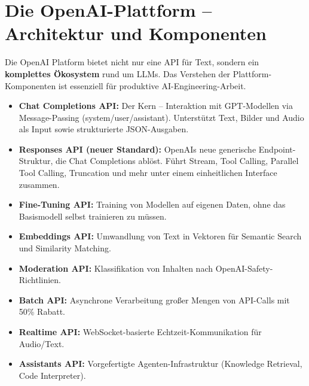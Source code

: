 \section{Die OpenAI-Plattform -- Architektur und Komponenten}

Die OpenAI Platform bietet nicht nur eine API für Text, sondern ein \textbf{komplettes Ökosystem} rund um LLMs. Das Verstehen der Plattform-Komponenten ist essenziell für produktive AI-Engineering-Arbeit.

\begin{itemize}

    \item \textbf{Chat Completions API:} Der Kern -- Interaktion mit GPT-Modellen via Message-Passing (system/user/assistant). Unterstützt Text, Bilder und Audio als Input sowie strukturierte JSON-Ausgaben.
    \item \textbf{Responses API (neuer Standard):} OpenAIs neue generische Endpoint-Struktur, die Chat Completions ablöst. Führt Stream, Tool Calling, Parallel Tool Calling, Truncation und mehr unter einem einheitlichen Interface zusammen.
    \item \textbf{Fine-Tuning API:} Training von Modellen auf eigenen Daten, ohne das Basismodell selbst trainieren zu müssen.
    \item \textbf{Embeddings API:} Umwandlung von Text in Vektoren für Semantic Search und Similarity Matching.
    \item \textbf{Moderation API:} Klassifikation von Inhalten nach OpenAI-Safety-Richtlinien.
    \item \textbf{Batch API:} Asynchrone Verarbeitung großer Mengen von API-Calls mit 50\% Rabatt.
    \item \textbf{Realtime API:} WebSocket-basierte Echtzeit-Kommunikation für Audio/Text.
    \item \textbf{Assistants API:} Vorgefertigte Agenten-Infrastruktur (Knowledge Retrieval, Code Interpreter).
\end{itemize}

